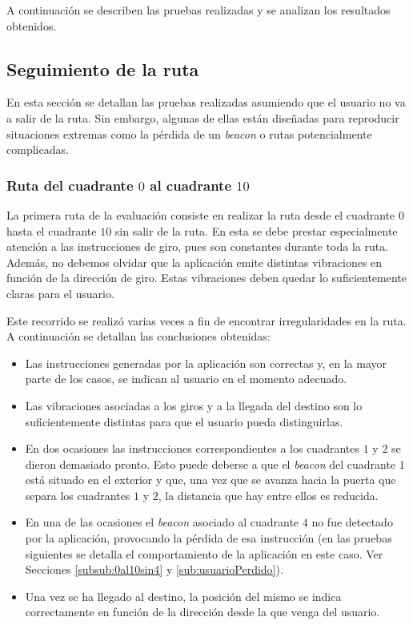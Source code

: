 A continuación se describen las pruebas realizadas y se analizan los resultados obtenidos.

\subsection{Seguimiento de la ruta}
En esta sección se detallan las pruebas realizadas asumiendo que el usuario no va a salir de la ruta. Sin embargo, algunas de ellas están diseñadas para reproducir situaciones extremas como la pérdida de un \textit{beacon} o rutas potencialmente complicadas.


\subsubsection{Ruta del cuadrante $0$ al cuadrante $10$}
\label{subsub:0al10}
La primera ruta de la evaluación consiste en realizar la ruta desde el cuadrante $0$ hasta el cuadrante $10$ sin salir de la ruta. En esta se debe prestar especialmente atención a las instrucciones de giro, pues son constantes durante toda la ruta. Además, no debemos olvidar que la aplicación emite distintas vibraciones en función de la dirección de giro. Estas vibraciones deben quedar lo suficientemente claras para el usuario. 

Este recorrido se realizó varias veces a fin de encontrar irregularidades en la ruta. A continuación se detallan las conclusiones obtenidas:

\begin{itemize}
	\item Las instrucciones generadas por la aplicación son correctas y, en la mayor parte de los casos, se indican al usuario en el momento adecuado.
	
	\item Las vibraciones asociadas a los giros y a la llegada del destino son lo suficientemente distintas para que el usuario pueda distinguirlas.
	
	\item En dos ocasiones las instrucciones correspondientes a los cuadrantes $1$ y $2$ se dieron demasiado pronto. Esto puede deberse a que el \textit{beacon} del cuadrante $1$ está situado en el exterior y que, una vez que se avanza hacia la puerta que separa los cuadrantes $1$ y $2$, la distancia que hay entre ellos es reducida.
	
	\item En una de las ocasiones el \textit{beacon} asociado al cuadrante $4$ no fue detectado por la aplicación, provocando la pérdida de esa instrucción (en las pruebas siguientes se detalla el comportamiento de la aplicación en este caso. Ver Secciones \ref{subsub:0al10sin4} y \ref{sub:usuarioPerdido}).
	
	\item Una vez se ha llegado al destino, la posición del mismo se indica correctamente en función de la dirección desde la que venga del usuario.
	
\end{itemize}

